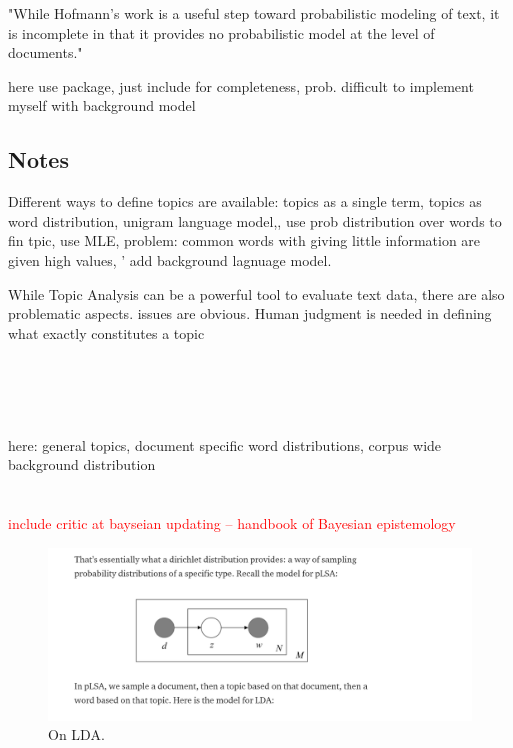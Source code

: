 \documentclass[11pt,a4paper,english,oneside]{book}
\numberwithin{equation}{chapter}
\begin{document}
"While Hofmann’s work is a useful step toward probabilistic modeling of text, it is incomplete in that it provides no probabilistic model at the level of documents." \cite[p. 994]{Blei.2003}


here use package, just include for completeness, prob. difficult to implement myself with background model




\subsection{Notes}


Different ways to define topics are available: topics as a single term, topics as word distribution,
unigram language model,, use prob distribution over words to fin tpic, use MLE, problem: common words with giving little information are given high values, ' add background lagnuage model.  

While Topic Analysis can be a powerful tool to evaluate text data, there are also problematic aspects. issues are obvious. Human judgment is needed in defining what exactly constitutes a topic

\cite{Hoffman2010} \\
\cite{Steyvers(2007)}\\
\cite{Blei.2003}\\
\cite{Asuncion.2009}\\
here:  general topics, document specific word distributions, corpus wide background distribution \cite{Chem.2007}\\
\cite{Bishop.2006}\\
\cite{Darling.2011}\\

\textcolor{red}{include critic at bayseian updating -- handbook of Bayesian epistemology}

\begin{figure}
	\caption{On LDA.}
	\centering
	\includegraphics[scale=0.5]{Images/tempPLSA.png}
\end{figure}
\end{document}
